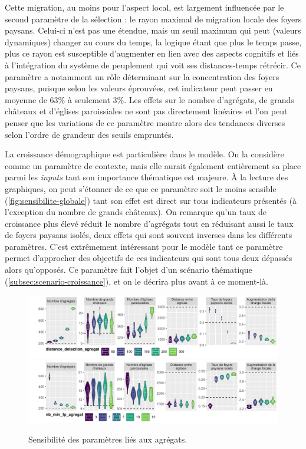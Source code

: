Cette migration, au moins pour l'aspect local, est largement influencée par le second paramètre de la sélection : le rayon maximal de migration locale des foyers paysans. 
Celui-ci n'est pas une étendue, mais un seuil maximum qui peut (valeurs \og dynamiques\fg{}) changer au cours du temps, la logique étant que plus le temps passe, plus ce rayon est susceptible d'augmenter en lien avec des aspects cognitifs et liés à l'intégration du système de peuplement qui voit ses distances-temps rétrécir.
Ce paramètre a notamment un rôle déterminant sur la concentration des foyers paysans, puisque selon les valeurs éprouvées, cet indicateur peut passer en moyenne de 63\% à seulement 3\%.
Les effets sur le nombre d'agrégats, de grands châteaux et d'églises paroissiales ne sont pas directement linéaires et l'on peut penser que les variations de ce paramètre montre alors des tendances diverses selon l'ordre de grandeur des seuils empruntés.

La croissance démographique est particulière dans le modèle.
On la considère comme un paramètre de contexte, mais elle aurait également entièrement sa place parmi les \textit{inputs} tant son importance thématique est majeure.
À la lecture des graphiques, on peut s'étonner de ce que ce paramètre soit le moins sensible (\cref{fig:sensibilite-globale}) tant son effet est direct sur tous indicateurs présentés (à l'exception du nombre de grands châteaux).
On remarque qu'un taux de croissance plus élevé réduit le nombre d'agrégats tout en réduisant aussi le taux de foyers paysans isolés, deux effets qui sont souvent inverses dans les différents paramètres.
C'est extrêmement intéressant pour le modèle tant ce paramètre permet d'approcher des objectifs de ces indicateurs qui sont tous deux dépassés alors qu'opposés.
Ce paramètre fait l'objet d'un scénario thématique (\cref{subsec:scenario-croissance}), et on le décrira plus avant à ce moment-là.


\begin{figure}[H]
	\centering
	\includegraphics[width=\linewidth]{img/sensib/sensibilite_distance_detection_agregat.pdf}
	\includegraphics[width=\linewidth]{img/sensib/sensibilite_nb_min_fp_agregat.pdf}
	\caption{Sensibilité des paramètres liés aux agrégats.}
	\label{fig:sensib-agregats}
\end{figure}

